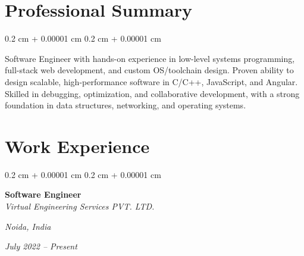 \documentclass[10pt, letterpaper]{article}
\newenvironment{onecolentry}{
    \begin{adjustwidth}{
        0.2 cm + 0.00001 cm
    }{
        0.2 cm + 0.00001 cm
    }
}{
    \end{adjustwidth}
} %
\newenvironment{twocolentry}[2][]{
    \onecolentry
    \def\secondColumn{#2}
    \setcolumnwidth{\fill, 4.5 cm}
    \begin{paracol}{2}
}{
    \switchcolumn \raggedleft \secondColumn
    \end{paracol}
    \endonecolentry
} %
\begin{document}
    \section{Professional Summary}
    \begin{onecolentry}
        Software Engineer with hands-on experience in low-level systems programming, full-stack web development, and custom OS/toolchain design. Proven ability to design scalable, high-performance software in C/C++, JavaScript, and Angular. Skilled in debugging, optimization, and collaborative development, with a strong foundation in data structures, networking, and operating systems.
    \end{onecolentry}

    \section{Work Experience}

    \vspace{0.2 cm}

        \begin{twocolentry}{
        \textit{Noida, India}    

        \textit{July 2022 – Present}}
            \textbf{Software Engineer} \\
            \textit{Virtual Engineering Services PVT. LTD.}
        \end{twocolentry}
\end{document}
